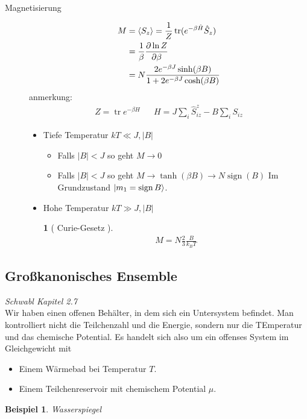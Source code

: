 \documentclass[11pt]{article}
\theoremstyle{plain}
\newtheorem*{beispiel}{Beispiel}
\theoremstyle{mytheoremstyle}
\newtheorem*{theorem*}{}
\newcommand{\abs}[1]{\left| #1 \right|}
\newcommand{\pd}[2]{\frac{\partial #1 }{\partial #2}}
\newcommand{\trace}{\operatorname{tr}}
\newcommand{\sign}{\operatorname{sign}}
\begin{document}
\begin{description}
  \item[Magnetisierung] 
    \begin{align*}
      M & = \Braket{S_z} = \frac{1}{Z} \trace (e^{-\beta \hat{H}} \hat{S}_z) \\
        & = \frac{1}{\beta} \pd{\ln{ Z}}{\beta} \\
        & = N \frac{2 e^{-\beta J} \sinh(\beta B)}{1 + 2 e^{-\beta J} \cosh
    (\beta B)}
    \end{align*}
    anmerkung:
    \begin{align*}
      Z = \trace e^{-\beta H} && H = J \sum_{i}^{} \hat{S}_{iz}^z - B \sum_{i}^{}
      S_{iz}
    \end{align*}
    \begin{itemize}
      \item Tiefe Temperatur $k T \ll J, \abs{B}$
        \begin{itemize}
          \item Falls $\abs{B} < J$ so geht $M \to 0$ \\
          \item Falls $\abs{B} < J$ so geht $M \to \tanh(\beta B) \to N \sign(B)$
            Im Grundzustand $ \Ket{m_1 = \sign B}$.
        \end{itemize}
    \item Hohe Temperatur $k T \gg J, \abs{B}$ \\
        \begin{theorem*}[ Curie-Gesetz ]
            \begin{align*}
                M = N \frac{2}{3} \frac{B}{k_B T}
            \end{align*}
        \end{theorem*}

        
    \end{itemize}
\end{description}
\subsection*{Gro\ss{}kanonisches Ensemble}
\emph{Schwabl Kapitel 2.7} \\
Wir haben einen offenen Beh\"alter, in dem sich ein Untersystem befindet.
Man kontrolliert nicht die Teilchenzahl und die Energie, sondern nur die TEmperatur
und das chemische Potential.
Es handelt sich also um ein offenses System im Gleichgewicht mit
\begin{itemize}
  \item Einem W\"armebad bei Temperatur $T$.
  \item Einem Teilchenreservoir mit chemischem Potential $\mu$.
\end{itemize}
\begin{beispiel} Wasserspiegel
    
\end{beispiel}
\end{document}
